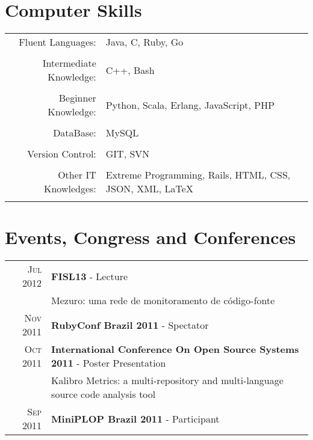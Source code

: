 \documentclass[a4paper,10pt]{article} %
\begin{document}

\section{Computer Skills}

\begin{tabular}{rp{11cm}}
Fluent Languages: & Java, C, Ruby, Go\\
    \multicolumn{2}{c}{} \\

Intermediate Knowledge: & C++, Bash\\
    \multicolumn{2}{c}{} \\

Beginner Knowledge: & Python, Scala, Erlang, JavaScript, PHP\\
    \multicolumn{2}{c}{} \\

DataBase: & MySQL\\
    \multicolumn{2}{c}{} \\

Version Control: & GIT, SVN\\
    \multicolumn{2}{c}{} \\

Other IT Knowledges: & Extreme Programming, Rails, HTML, CSS, JSON, XML, \LaTeX\\
    \multicolumn{2}{c}{} \\

\end{tabular}

\section{Events, Congress and Conferences}

\begin{tabular}{rl}
\textsc{Jul} 2012 & \textbf{FISL13} - Lecture\\
& \footnotesize{Mezuro: uma rede de monitoramento de código-fonte}\\

\textsc{Nov} 2011 & \textbf{RubyConf Brazil 2011} - Spectator\\
\textsc{Oct} 2011 & \textbf{International Conference On Open Source Systems 2011} - Poster Presentation\\
& \footnotesize{Kalibro Metrics: a multi-repository and multi-language source code analysis tool}\\
\textsc{Sep} 2011 & \textbf{MiniPLOP Brazil 2011} - Participant


\end{tabular}
\end{document}
